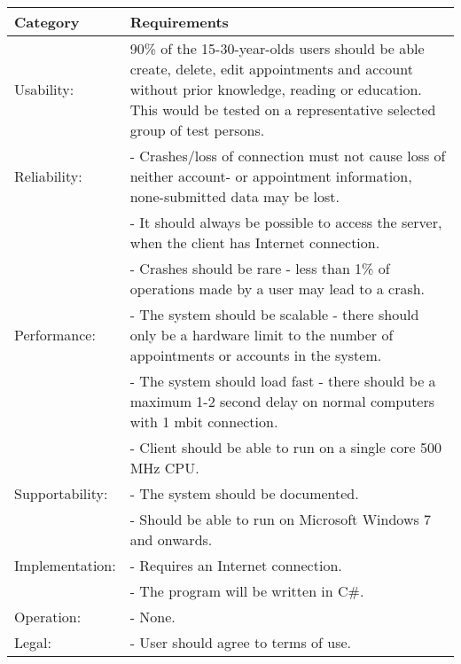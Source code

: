 {\tabulinesep=1.2mm
\begin{tabu}{ | p{3cm} | p{13cm} |}
    \hline
    Category	 			& 		Requirements \\\hline
    Usability:	  			& 		90\% of the 15-30-year-olds users should be able create, delete, edit appointments and account without prior knowledge, reading or education. This would be tested on a representative selected group of test persons.\\\hline
    Reliability: 			& 		- Crashes/loss of connection must not cause loss of neither account- or appointment information, none-submitted data may be lost. \\
							&		- It should always be possible to access the server, when the client has Internet connection.\\
							&		- Crashes should be rare - less than 1\% of operations made by a user may lead to a crash. \\ \hline
	Performance:			&		- The system should be scalable - there should only be a hardware limit to the number of appointments or accounts in the system.\\
							&		- The system should load fast - there should be a maximum 1-2 second delay on normal computers with 1 mbit connection.\\
							&		- Client should be able to run on a single core 500 MHz CPU.\\ \hline
    Supportability: 		& 		- The system should be documented.  \\
    						&		- Should be able to run on Microsoft Windows 7 and onwards. \\ \hline
	Implementation: 		&		- Requires an Internet connection.\\
							&		- The program will be written in C\#.\\\hline
	Operation:				&	 	- None. \\\hline
	Legal:					&		- User should agree to terms of use.\\\hline
\end{tabu}
}
